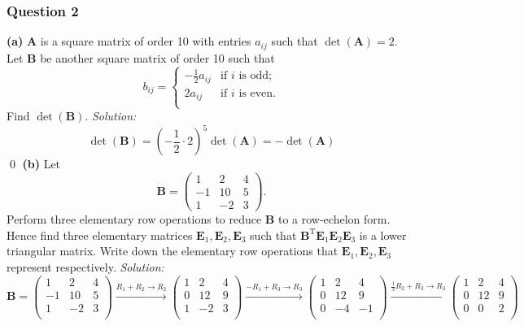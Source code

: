 \documentclass{article}
\begin{document}
\subsubsection*{Question 2}
\textbf{(a)} $\mathbf{A}$ is a square matrix of order 10 with entries $a_{ij}$ such that $\operatorname{det}(\mathbf{A})=2$. Let $\mathbf{B}$ be another square matrix of order 10 such that \[{{b}_{ij}}=\left\{ \begin{matrix}
   -\frac{1}{2}{{a}_{ij}} & \text{if }i\text{ is odd;}  \\
   2{{a}_{ij}} & \text{if }i\text{ is even}\text{.}  \\
\end{matrix} \right.\]
Find $\operatorname{det}(\mathbf{B})$.
\newline
\newline\textit{Solution:} \[\operatorname{det}(\mathbf{B})=\left(-\frac{1}{2} \cdot 2\right)^5\det(\mathbf{A})=-\det(\mathbf{A})\] \qed 
\newline
\newline
\textbf{(b)} Let \[\mathbf{B}=\begin{pmatrix}1&2&4\\-1&10&5\\1&-2&3\end{pmatrix}.\]
Perform three elementary row operations to reduce $\mathbf{B}$ to a row-echelon form. Hence find three elementary matrices $\mathbf{E}_1,\mathbf{E}_2,\mathbf{E}_3$ such that $\mathbf{B}^\text{T}\mathbf{E}_1\mathbf{E}_2\mathbf{E}_3$ is a lower triangular matrix. Write down the elementary row operations that $\mathbf{E}_1,\mathbf{E}_2,\mathbf{E}_3$ represent respectively.
\newline
\newline\textit{Solution:} \[\mathbf{B}=\left( \begin{matrix}
   1 & 2 & 4  \\
   -1 & 10 & 5  \\
   1 & -2 & 3  \\
\end{matrix} \right)\xrightarrow{{{R}_{1}}+{{R}_{2}}\to {{R}_{2}}}\left( \begin{matrix}
   1 & 2 & 4  \\
   0 & 12 & 9  \\
   1 & -2 & 3  \\
\end{matrix} \right)\xrightarrow{-{{R}_{1}}+{{R}_{3}}\to {{R}_{3}}}\left( \begin{matrix}
   1 & 2 & 4  \\
   0 & 12 & 9  \\
   0 & -4 & -1  \\
\end{matrix} \right)\xrightarrow{\frac{1}{3}{{R}_{2}}+{{R}_{3}}\to {{R}_{3}}}\left( \begin{matrix}
   1 & 2 & 4  \\
   0 & 12 & 9  \\
   0 & 0 & 2  \\
\end{matrix} \right)\]
\end{document}

